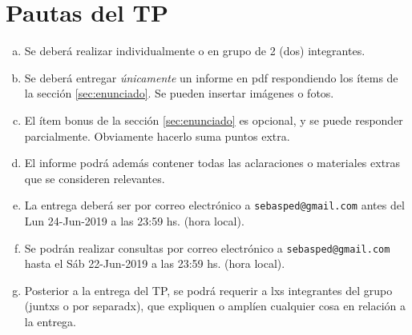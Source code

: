 \documentclass[a4paper,12pt]{article}
\begin{document}
\section{Pautas del TP}
	\begin{enumerate}[a)]
	\item Se deberá realizar individualmente o en grupo de 2 (dos) integrantes.
	\item Se deberá entregar \emph{únicamente} un informe en pdf respondiendo los ítems de la sección \ref{sec:enunciado}. Se pueden insertar imágenes o fotos.
	\item El ítem bonus de la sección \ref{sec:enunciado} es opcional, y se puede responder parcialmente. Obviamente hacerlo suma puntos extra.
	\item El informe podrá además contener todas las aclaraciones o materiales extras que se consideren relevantes. 
	\item La entrega deberá ser por correo electrónico a \verb|sebasped@gmail.com| antes del Lun 24-Jun-2019 a las 23:59 hs. (hora local).
	\item Se podrán realizar consultas por correo electrónico a \verb|sebasped@gmail.com| hasta el Sáb 22-Jun-2019 a las 23:59 hs. (hora local).
	\item Posterior a la entrega del TP, se podrá requerir a lxs integrantes del grupo (juntxs o por separadx), que expliquen o amplíen cualquier cosa en relación a la entrega.
	
	\end{enumerate}
\end{document}

